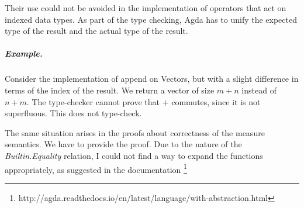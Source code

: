 \documentclass[12pt,twoside,notitlepage]{report}
\newcommand{\Conid}[1]{\mathit{#1}}
\newcommand{\Varid}[1]{\mathit{#1}}
\def\resethooks{%
  \global\let\SaveRestoreHook\empty
  \global\let\ColumnHook\empty}
\newcommand{\hsindent}[1]{\quad}%
\let\hspre\empty
\let\hspost\empty
\begin{document}
Their use could not be avoided in the implementation of operators that act on indexed data types. As part of the type checking, Agda has to unify the expected type of the result and the actual type of the result. 

\subparagraph{Example.} Consider the implementation of append on Vectors, but with a slight difference in terms of the index of the result. We return a vector of size $m + n$ instead of $n + m$. The type-checker cannot prove that  $+$ commutes, since it is not superfluous. This does not type-check.

\resethooks

The same situation arises in the proofs about correctness of the measure semantics. We have to provide the proof. Due to the nature of the \textit{Builtin.Equality} relation, I could not find a way to expand the functions appropriately, as suggested in the documentation \footnote{http://agda.readthedocs.io/en/latest/language/with-abstraction.html}
\end{document}
